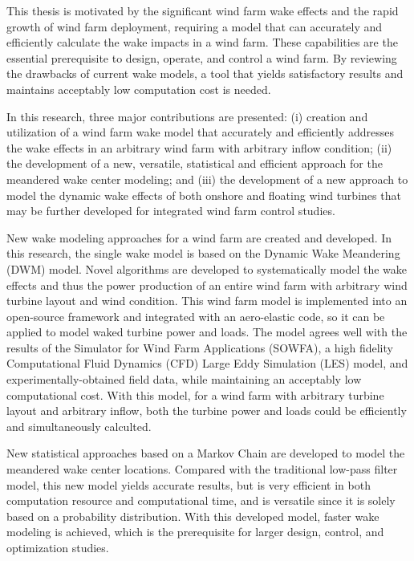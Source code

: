 \documentclass{umthesis}
\begin{document}
This thesis is motivated by the significant wind farm wake effects and the rapid growth of wind farm deployment, requiring a model that can accurately and efficiently calculate the wake impacts in a wind farm. These capabilities are the essential prerequisite to design, operate, and control a wind farm. By reviewing the drawbacks of current wake models, a tool that yields satisfactory results and maintains acceptably low computation cost is needed.

In this research, three major contributions are presented: (i) creation and utilization of a wind farm wake model that accurately and efficiently addresses the wake effects in an arbitrary wind farm with arbitrary inflow condition; (ii) the development of a new, versatile, statistical and efficient approach for the meandered wake center modeling; and (iii) the development of a new approach to model the dynamic wake effects of both onshore and floating wind turbines that may be further developed for integrated wind farm control studies.

New wake modeling approaches for a wind farm are created and developed. In this research, the single wake model is based on the Dynamic Wake Meandering (DWM) model. Novel algorithms are developed to systematically model the wake effects and thus the power production of an entire wind farm with arbitrary wind turbine layout and wind condition. This wind farm model is implemented into an open-source framework and integrated with an aero-elastic code, so it can be applied to model waked turbine power and loads. The model agrees well with the results of the Simulator for Wind Farm Applications (SOWFA), a high fidelity Computational Fluid Dynamics (CFD) Large Eddy Simulation (LES) model, and experimentally-obtained field data, while maintaining an acceptably low computational cost. With this model, for a wind farm with arbitrary turbine layout and arbitrary inflow, both the turbine power and loads could be efficiently and simultaneously calculted.  

New statistical approaches based on a Markov Chain are developed to model the meandered wake center locations. Compared with the traditional low-pass filter model, this new model yields accurate results, but is very efficient in both computation resource and computational time, and is versatile since it is solely based on a probability distribution. With this developed model, faster wake modeling is achieved, which is the prerequisite for larger design, control, and optimization studies.
\end{document}
